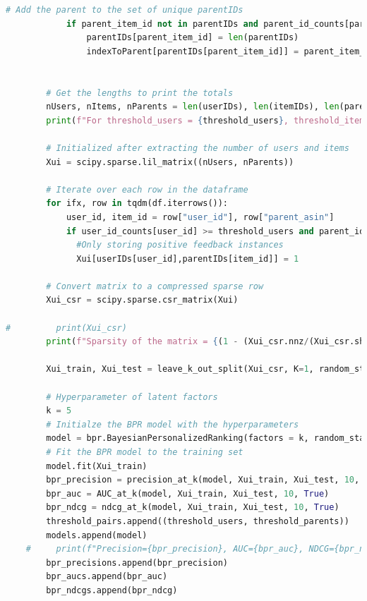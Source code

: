 \documentclass{article}
\begin{document}
\begin{lstlisting}[language=Python ]
            # Add the parent to the set of unique parentIDs
            if parent_item_id not in parentIDs and parent_id_counts[parent_item_id] >= threshold_parents:
                parentIDs[parent_item_id] = len(parentIDs)
                indexToParent[parentIDs[parent_item_id]] = parent_item_id


        # Get the lengths to print the totals
        nUsers, nItems, nParents = len(userIDs), len(itemIDs), len(parentIDs)
        print(f"For threshold_users = {threshold_users}, threshold_items = {threshold_parents}, there are a total of {nUsers} users and {nParents} products with a total of {nItems} items including all variants.")

        # Initialized after extracting the number of users and items
        Xui = scipy.sparse.lil_matrix((nUsers, nParents))

        # Iterate over each row in the dataframe
        for ifx, row in tqdm(df.iterrows()):
            user_id, item_id = row["user_id"], row["parent_asin"]
            if user_id_counts[user_id] >= threshold_users and parent_id_counts[item_id] >= threshold_parents:
              #Only storing positive feedback instances
              Xui[userIDs[user_id],parentIDs[item_id]] = 1

        # Convert matrix to a compressed sparse row
        Xui_csr = scipy.sparse.csr_matrix(Xui)

#         print(Xui_csr)
        print(f"Sparsity of the matrix = {(1 - (Xui_csr.nnz/(Xui_csr.shape[0]*Xui_csr.shape[1]))):.6f}%")

        Xui_train, Xui_test = leave_k_out_split(Xui_csr, K=1, random_state=random_state)

        # Hyperparameter of latent factors
        k = 5
        # Initialze the BPR model with the hyperparameters
        model = bpr.BayesianPersonalizedRanking(factors = k, random_state=random_state, iterations=100, regularization=0.01)
        # Fit the BPR model to the training set
        model.fit(Xui_train)
        bpr_precision = precision_at_k(model, Xui_train, Xui_test, 10, True)
        bpr_auc = AUC_at_k(model, Xui_train, Xui_test, 10, True)
        bpr_ndcg = ndcg_at_k(model, Xui_train, Xui_test, 10, True)
        threshold_pairs.append((threshold_users, threshold_parents))
        models.append(model)
    #     print(f"Precision={bpr_precision}, AUC={bpr_auc}, NDCG={bpr_ndcg}")
        bpr_precisions.append(bpr_precision)
        bpr_aucs.append(bpr_auc)
        bpr_ndcgs.append(bpr_ndcg)


\end{lstlisting}
\end{document}
